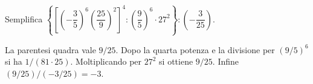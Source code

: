 
\begin{esercizio}
Semplifica $\left\{\left[\left(-\dfrac35\right)^6\left(\dfrac{25}{9}\right)^2\right]^4:\left(\dfrac95\right)^6\cdot27^2\right\}:\left(-\dfrac3{25}\right)$.
\end{esercizio}

\begin{soluzione}
La parentesi quadra vale $9/25$. Dopo la quarta potenza e la divisione per $(9/5)^6$ si ha $1/(81\cdot25)$. Moltiplicando per $27^2$ si ottiene $9/25$. Infine $(9/25)/(-3/25)=-3$.
\end{soluzione}
